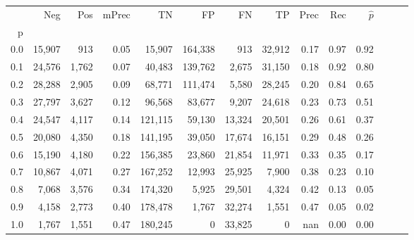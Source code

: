 \begin{tabular}{rrrrrrrrrrrrrr}
\toprule
{} &     Neg &    Pos & mPrec &       TN &       FP &      FN &      TP &  Prec &   Rec & $\hat{p}$ \\
p   &         &        &       &          &          &         &         &       &       &           \\
\midrule
0.0 &  15,907 &    913 &  0.05 &   15,907 &  164,338 &     913 &  32,912 &  0.17 &  0.97 &      0.92 \\
0.1 &  24,576 &  1,762 &  0.07 &   40,483 &  139,762 &   2,675 &  31,150 &  0.18 &  0.92 &      0.80 \\
0.2 &  28,288 &  2,905 &  0.09 &   68,771 &  111,474 &   5,580 &  28,245 &  0.20 &  0.84 &      0.65 \\
0.3 &  27,797 &  3,627 &  0.12 &   96,568 &   83,677 &   9,207 &  24,618 &  0.23 &  0.73 &      0.51 \\
0.4 &  24,547 &  4,117 &  0.14 &  121,115 &   59,130 &  13,324 &  20,501 &  0.26 &  0.61 &      0.37 \\
0.5 &  20,080 &  4,350 &  0.18 &  141,195 &   39,050 &  17,674 &  16,151 &  0.29 &  0.48 &      0.26 \\
0.6 &  15,190 &  4,180 &  0.22 &  156,385 &   23,860 &  21,854 &  11,971 &  0.33 &  0.35 &      0.17 \\
0.7 &  10,867 &  4,071 &  0.27 &  167,252 &   12,993 &  25,925 &   7,900 &  0.38 &  0.23 &      0.10 \\
0.8 &   7,068 &  3,576 &  0.34 &  174,320 &    5,925 &  29,501 &   4,324 &  0.42 &  0.13 &      0.05 \\
0.9 &   4,158 &  2,773 &  0.40 &  178,478 &    1,767 &  32,274 &   1,551 &  0.47 &  0.05 &      0.02 \\
1.0 &   1,767 &  1,551 &  0.47 &  180,245 &        0 &  33,825 &       0 &   nan &  0.00 &      0.00 \\
\bottomrule
\end{tabular}
